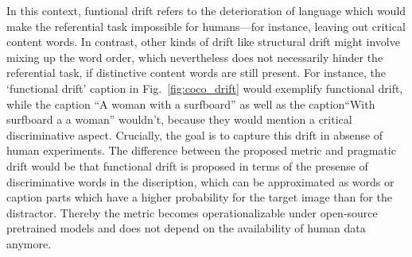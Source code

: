 In this context, funtional drift refers to the deterioration of language which would make the referential task impossible for humans---for instance, leaving out critical content words. 
In contrast, other kinds of drift like structural drift might involve mixing up the word order, which nevertheless does not necessarily hinder the referential task, if distinctive content words are still present. For instance, the `functional drift' caption in Fig.~\ref{fig:coco_drift} would exemplify functional drift, while the caption ``A woman with a surfboard'' as well as the caption``With surfboard a a woman'' wouldn't, because they would mention a critical discriminative aspect. 
Crucially, the goal is to capture this drift in absense of human experiments. The difference between the proposed metric and pragmatic drift would be that functional drift is proposed in terms of the presense of discriminative words in the discription, which can be approximated as words or caption parts which have a higher probability for the target image than for the distractor. Thereby the metric becomes operationalizable under open-source pretrained models and does not depend on the availability of human data anymore. 


